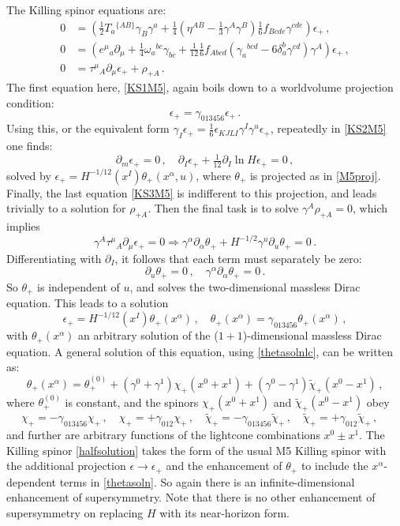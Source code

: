 \documentclass[11pt]{article}
\newcommand{\be}{\begin{equation}}
\newcommand{\ee}{\end{equation}}
\numberwithin{equation}{section}
\begin{document}
{{The Killing spinor equations are:
\begin{subequations}\label{KSansatzM5smeared}
\begin{align} 
\label{KS1M5}
0& =  \left(
\tfrac12  T_{a}{}^{\{AB\}} \gamma_B \gamma^a 
+\tfrac14 ( \eta^{AB} - \tfrac13 \gamma^A \gamma^B ) \tfrac16 f_{Bcde} \gamma^{cde} \right) \epsilon_+
\,,\\[4pt] 
0 & = \left(e^\mu{}_a \partial_\mu  + \tfrac{1}{4} \omega_a{}^{bc} \gamma_{bc}  
+\tfrac{1}{12} \tfrac{1}{6}  f_{A bcd} ( \gamma_a{}^{bcd} - 6 \delta_a^b \gamma^{cd} ) \gamma^A \right) \epsilon_+  \,,
\label{KS2M5}
\\[4pt]
0 & = \tau^{\mu}{}_A \partial_\mu \epsilon_+
+ \rho_{+A}  \,.
\label{KS3M5}
\end{align}
\end{subequations}
The first equation here, \eqref{KS1M5}, again boils down to a worldvolume projection condition:
\be
\epsilon_+ = \gamma_{013456} \epsilon_+ \,.
\label{M5proj}
\ee
Using this, or the equivalent form $\gamma_I \epsilon_+ = \tfrac16 \epsilon_{KJLI} \gamma^I \gamma^u \epsilon_+$, repeatedly in \eqref{KS2M5} one finds:
\be
\partial_m \epsilon_+ = 0 \,,\quad
\partial_I \epsilon_+  + \tfrac{1}{12} \partial_I \ln H \epsilon_+ = 0 \,,
\ee
solved by $\epsilon_+ = H^{-1/12}(x^I) \theta_+(x^\alpha,u)$, where $\theta_+$ is projected as in \eqref{M5proj}.
Finally, the last equation \eqref{KS3M5} is indifferent to this projection, and leads trivially to a solution for $\rho_{+A}$. Then the final task is to solve $\gamma^A \rho_{+A} = 0$, which implies
\be
\gamma^A \tau^\mu{}_A \partial_\mu \epsilon_+ =  0 
\Rightarrow
\gamma^\alpha  \partial_\alpha \theta_+ + H^{-1/2} \gamma^u \partial_u \theta_+ 
= 0 \,.
\ee
Differentiating with $\partial_I$, it follows that each term must separately be zero:
\be
\partial_u \theta_+ = 0 \,,\quad 
\gamma^\alpha \partial_\alpha \theta_+ =0 \,.
\ee
So $\theta_+$ is independent of $u$, and solves the two-dimensional massless Dirac equation. 
This leads to a solution
\be
\epsilon_+ = H^{-1/12}(x^I) \theta_+(x^\alpha) \,,\quad \theta_+(x^\alpha) = \gamma_{013456} \theta_+(x^\alpha)\,,
\label{halfsolution}
\ee
with $\theta_+(x^\alpha)$ an arbitrary solution of the ($1+1$)-dimensional massless Dirac equation.
A general solution of this equation, using \eqref{thetasolnlc}, can be written as:
\be
\theta_+(x^\alpha) = \theta_+^{(0)}+ (\gamma^0 + \gamma^1) \chi_+(x^0 + x^1) + (\gamma^0 - \gamma^1) \tilde \chi_+(x^0 - x^1) \,,
\label{thetasoln}
\ee
where $\theta_+^{(0)}$ is constant, and the spinors $\chi_+(x^0+x^1)$ and $\tilde \chi_+(x^0-x^1)$ obey
\be
\chi_+ = - \gamma_{013456} \chi_+ \,,\quad
\chi_+ = + \gamma_{012} \chi_+ \,,\quad
\tilde \chi_+ = - \gamma_{013456} \tilde \chi_+ \,,\quad
\tilde \chi_+ = + \gamma_{012} \tilde \chi_+ \,,\quad
\ee
and further are arbitrary functions of the lightcone combinations $x^0\pm x^1$.
The Killing spinor \eqref{halfsolution} takes the form of the usual M5 Killing spinor with the additional projection $\epsilon \rightarrow \epsilon_+$ and the enhancement of $\theta_+$ to include the $x^\alpha$-dependent terms in \eqref{thetasoln}.
So again there is an infinite-dimensional enhancement of supersymmetry.
Note that there is no other enhancement of supersymmetry on replacing $H$ with its near-horizon form.

}}
\end{document}
